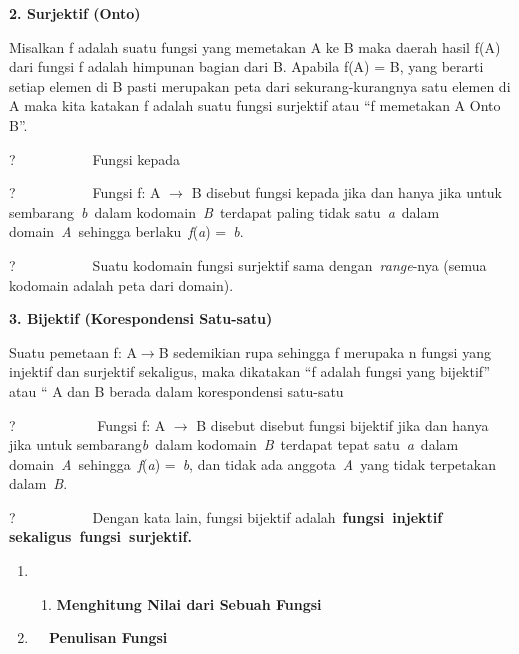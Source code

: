 \documentclass[11pt,fleqn]{book} %
\begin{document}
\noindent \textbf{2.   Surjektif (Onto)}

\noindent Misalkan f adalah suatu fungsi yang memetakan A ke B maka daerah hasil f(A) dari fungsi f adalah himpunan bagian dari B. Apabila f(A) = B, yang berarti setiap elemen di B pasti merupakan peta dari sekurang-kurangnya satu elemen di A maka kita katakan f adalah suatu fungsi surjektif atau ``f memetakan A Onto B''.

\noindent ?~~~~~~~~~~~Fungsi kepada

\noindent ?~~~~~~~~~~~Fungsi f: A $\mathrm{\to}$ B disebut fungsi kepada jika dan hanya jika untuk sembarang~\textit{b}~dalam kodomain~\textit{B}~terdapat paling tidak satu~\textit{a}~dalam domain~\textit{A}~sehingga berlaku~\textit{f}(\textit{a}) =~\textit{b}.

\noindent ?~~~~~~~~~~~Suatu kodomain fungsi surjektif sama dengan~\textit{range}-nya (semua kodomain adalah peta dari domain).

\noindent 

\noindent \textbf{3. Bijektif (Korespondensi Satu-satu)}

\noindent 

\noindent Suatu pemetaan f: A$\mathrm{\to}$B sedemikian rupa sehingga f merupaka n fungsi yang injektif dan surjektif sekaligus, maka dikatakan ``f adalah fungsi yang bijektif'' atau `` A dan B berada dalam korespondensi satu-satu

\noindent 

\noindent ?~~~~~~~~~~~ Fungsi f: A $\mathrm{\to}$ B disebut disebut fungsi bijektif jika dan hanya jika untuk sembarang\textit{b}~dalam kodomain~\textit{B}~terdapat tepat satu~\textit{a}~dalam domain~\textit{A}~sehingga~\textit{f}(\textit{a}) =~\textit{b}, dan tidak ada anggota~\textit{A}~yang tidak terpetakan dalam~\textit{B}.

\noindent ?~~~~~~~~~~~Dengan kata lain, fungsi bijektif adalah~\textbf{fungsi~injektif sekaligus~fungsi~surjektif.}

\noindent \textbf{}

\noindent \textbf{}

\begin{enumerate}
\item \begin{enumerate}
\item \textbf{ Menghitung Nilai dari Sebuah Fungsi}
\end{enumerate}

\item \textbf{ ~~Penulisan Fungsi}
\end{enumerate}
\end{document}
